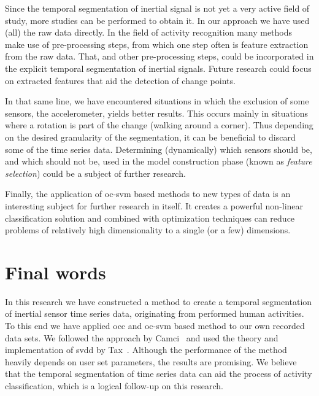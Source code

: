Since the temporal segmentation of inertial signal is not yet a very active field of study, more studies can be performed to obtain it.
In our approach we have used (all) the raw data directly.
In the field of activity recognition many methods make use of pre-processing steps, from which one step often is feature extraction from the raw data.
That, and other pre-processing steps, could be incorporated in the explicit temporal segmentation of inertial signals.
Future research could focus on extracted features that aid the detection of change points.

In that same line, we have encountered situations in which the exclusion of some sensors, \eg the accelerometer, yields better results.
This occurs mainly in situations where a rotation is part of the change (\eg walking around a corner).
Thus depending on the desired granularity of the segmentation, it can be beneficial to discard some of the time series data.
Determining (dynamically) which sensors should be, and which should not be, used in the model construction phase (known as \emph{feature selection}) could be a subject of further research.

Finally, the application of \gls{oc-svm} based methods to new types of data is an interesting subject for further research in itself.
It creates a powerful non-linear classification solution and combined with optimization techniques can reduce problems of relatively high dimensionality to a single (or a few) dimensions.

\section{Final words}\label{sec:final_remarks}
In this research we have constructed a method to create a temporal segmentation of inertial sensor time series data, originating from performed human activities.
To this end we have applied \gls{occ} and \gls{oc-svm} based method to our own recorded data sets.
We followed the approach by Camci~\cite{camci2010change} and used the theory and implementation of \gls{svdd} by Tax~\cite{tax2001one,Ddtools2013}.
Although the performance of the method heavily depends on user set parameters, the results are promising.
We believe that the temporal segmentation of time series data can aid the process of activity classification, which is a logical follow-up on this research.
